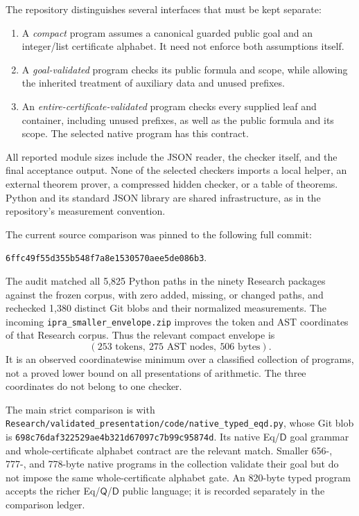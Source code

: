 \documentclass[11pt]{article}
\theoremstyle{definition}\newtheorem{definition}[theorem]{Definition}
\theoremstyle{remark}\newtheorem{remark}[theorem]{Remark}
\newcommand{\D}{\mathsf D}
\newcommand{\Q}{\mathsf Q}
\newcommand{\file}[1]{\nolinkurl{#1}}
\begin{document}
The repository distinguishes several interfaces that must be kept separate:
\begin{enumerate}
\item A \emph{compact} program assumes a canonical guarded public goal and an
integer/list certificate alphabet. It need not enforce both assumptions itself.
\item A \emph{goal-validated} program checks its public formula and scope,
while allowing the inherited treatment of auxiliary data and unused prefixes.
\item An \emph{entire-certificate-validated} program checks every supplied
leaf and container, including unused prefixes, as well as the public formula
and its scope. The selected native program has this contract.
\end{enumerate}
All reported module sizes include the JSON reader, the checker itself, and
the final acceptance output. None of the selected checkers imports a local
helper, an external theorem prover, a compressed hidden checker, or a table
of theorems. Python and its standard JSON library are shared infrastructure,
as in the repository's measurement convention.

The current source comparison was pinned to the following full commit:
\begin{center}\texttt{6ffc49f55d355b548f7a8e1530570aee5de086b3}.\end{center}
The audit
matched all 5,825 Python paths in the ninety Research packages against the
frozen corpus, with zero added, missing, or changed paths, and rechecked
1,380 distinct Git blobs and their normalized measurements. The incoming
\file{ipra_smaller_envelope.zip} improves the token and AST coordinates of
that Research corpus. Thus the relevant compact envelope is
\[
             (253\text{ tokens},\ 275\text{ AST nodes},\ 506\text{ bytes}).
\]
It is an observed coordinatewise minimum over a classified collection of
programs, not a proved lower bound on all presentations of arithmetic.
The three coordinates do not belong to one checker.

The main strict comparison is with
\file{Research/validated_presentation/code/native_typed_eqd.py}, whose
Git blob is \texttt{698c76daf322529ae4b321d67097c7b99c95874d}. Its native
Eq/\(\D\) goal grammar and whole-certificate alphabet contract are the
relevant match. Smaller 656-, 777-, and 778-byte native programs in the
collection validate their goal but do not impose the same whole-certificate
alphabet gate. An 820-byte typed program accepts the richer Eq/\(\Q\)/\(\D\)
public language; it is recorded separately in the comparison ledger.
\end{document}
